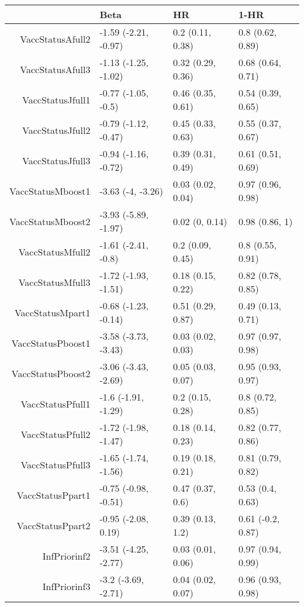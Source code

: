\begin{table}[ht]
\centering
\begin{tabular}{rlll}
  \hline
 & Beta & HR & 1-HR \\ 
  \hline
VaccStatusAfull2 & -1.59 (-2.21, -0.97) & 0.2 (0.11, 0.38) & 0.8 (0.62, 0.89) \\ 
  VaccStatusAfull3 & -1.13 (-1.25, -1.02) & 0.32 (0.29, 0.36) & 0.68 (0.64, 0.71) \\ 
  VaccStatusJfull1 & -0.77 (-1.05, -0.5) & 0.46 (0.35, 0.61) & 0.54 (0.39, 0.65) \\ 
  VaccStatusJfull2 & -0.79 (-1.12, -0.47) & 0.45 (0.33, 0.63) & 0.55 (0.37, 0.67) \\ 
  VaccStatusJfull3 & -0.94 (-1.16, -0.72) & 0.39 (0.31, 0.49) & 0.61 (0.51, 0.69) \\ 
  VaccStatusMboost1 & -3.63 (-4, -3.26) & 0.03 (0.02, 0.04) & 0.97 (0.96, 0.98) \\ 
  VaccStatusMboost2 & -3.93 (-5.89, -1.97) & 0.02 (0, 0.14) & 0.98 (0.86, 1) \\ 
  VaccStatusMfull2 & -1.61 (-2.41, -0.8) & 0.2 (0.09, 0.45) & 0.8 (0.55, 0.91) \\ 
  VaccStatusMfull3 & -1.72 (-1.93, -1.51) & 0.18 (0.15, 0.22) & 0.82 (0.78, 0.85) \\ 
  VaccStatusMpart1 & -0.68 (-1.23, -0.14) & 0.51 (0.29, 0.87) & 0.49 (0.13, 0.71) \\ 
  VaccStatusPboost1 & -3.58 (-3.73, -3.43) & 0.03 (0.02, 0.03) & 0.97 (0.97, 0.98) \\ 
  VaccStatusPboost2 & -3.06 (-3.43, -2.69) & 0.05 (0.03, 0.07) & 0.95 (0.93, 0.97) \\ 
  VaccStatusPfull1 & -1.6 (-1.91, -1.29) & 0.2 (0.15, 0.28) & 0.8 (0.72, 0.85) \\ 
  VaccStatusPfull2 & -1.72 (-1.98, -1.47) & 0.18 (0.14, 0.23) & 0.82 (0.77, 0.86) \\ 
  VaccStatusPfull3 & -1.65 (-1.74, -1.56) & 0.19 (0.18, 0.21) & 0.81 (0.79, 0.82) \\ 
  VaccStatusPpart1 & -0.75 (-0.98, -0.51) & 0.47 (0.37, 0.6) & 0.53 (0.4, 0.63) \\ 
  VaccStatusPpart2 & -0.95 (-2.08, 0.19) & 0.39 (0.13, 1.2) & 0.61 (-0.2, 0.87) \\ 
  InfPriorinf2 & -3.51 (-4.25, -2.77) & 0.03 (0.01, 0.06) & 0.97 (0.94, 0.99) \\ 
  InfPriorinf3 & -3.2 (-3.69, -2.71) & 0.04 (0.02, 0.07) & 0.96 (0.93, 0.98) \\ 

\end{tabular}
\end{table}
